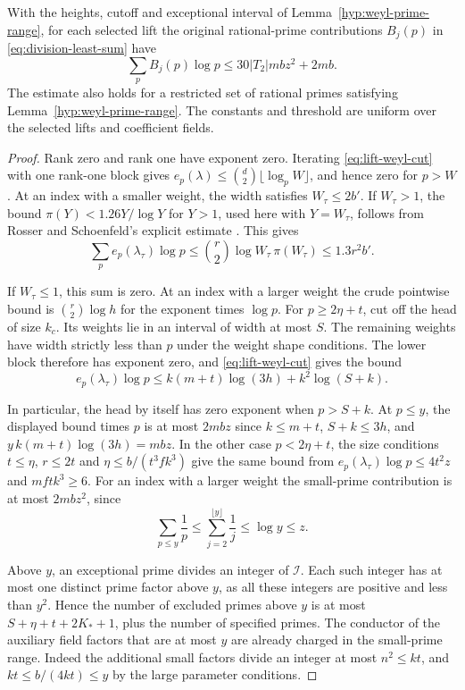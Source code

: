 \begin{proposition}
\label{prop:selected-weyl-prime-sum}
With the heights, cutoff and exceptional interval of
Lemma~\ref{hyp:weyl-prime-range}, for
each selected lift the original rational-prime contributions
\(B_j(p)\) in \eqref{eq:division-least-sum} have
\[
 \sum_p B_j(p)\log p\le30|T_2|mbz^2+2mb.
\]
The estimate also holds for a restricted set of rational primes
satisfying Lemma~\ref{hyp:weyl-prime-range}. The constants and threshold are
uniform over the selected lifts and coefficient fields.
\end{proposition}

\begin{proof}
Rank zero and rank one have exponent zero. Iterating
\eqref{eq:lift-weyl-cut} with one rank-one block gives
\(e_p(\lambda)\le\binom d2\lfloor\log_p W\rfloor\), and hence
zero for \(p>W\). At an index with a smaller weight, the width satisfies \(W_\tau\le2b'\).
If \(W_\tau>1\), the bound
\(\pi(Y)<1.26Y/\log Y\) for \(Y>1\), used here with
\(Y=W_\tau\), follows from Rosser and Schoenfeld's explicit
estimate \cite{rosser-schoenfeld-explicit}. This gives
\[
 \sum_p e_p(\lambda_\tau)\log p
 \le \binom r2\log W_\tau\,\pi(W_\tau)
 \le 1.3r^2 b'.
\]

If \(W_\tau\le1\), this sum is zero. At an index with a larger weight the
crude pointwise bound is \(\binom r2\log h\) for the
exponent times \(\log p\). For \(p\ge2\eta+t\), cut off the
head of size \(k_c\). Its weights lie in an interval of width
at most \(S\). The
remaining weights have width strictly less than \(p\) under
the weight shape conditions. The lower block therefore has
exponent zero, and \eqref{eq:lift-weyl-cut} gives the bound
\[
 e_p(\lambda_\tau)\log p\le
 k(m+t)\log(3h)+k^2\log(S+k).
\]

In particular, the head by itself has zero exponent when
\(p>S+k\). At \(p\le y\), the displayed bound times \(p\)
is at most \(2mbz\) since \(k\le m+t\), \(S+k\le3h\),
and \(y\,k(m+t)\log(3h)=mbz\). In the other case
\(p<2\eta+t\), the size conditions \(t\le\eta\), \(r\le2t\)
and \(\eta\le b/(t^3 f k^3)\) give the same bound from
\(e_p(\lambda_\tau)\log p\le4t^2 z\) and
\(m f t k^3\ge6\). For an index with a larger weight the small-prime contribution is at most \(2mbz^2\), since
\[
 \sum_{p\le y}\frac1p\le\sum_{j=2}^{\lfloor y\rfloor}\frac1j\le \log y\le z .
\]

Above \(y\), an exceptional prime divides an integer of
\(\mathcal I\). Each such integer has at most one distinct
prime factor above \(y\), as all these integers are positive
and less than \(y^2\). Hence the number of excluded primes
above \(y\) is at most \(S+\eta+t+2K_*+1\), plus the
number of specified primes. The conductor of the auxiliary field factors that
are at most \(y\) are already charged in the small-prime range.
Indeed the additional small factors divide an integer at most
\(n^2\le kt\), and \(kt\le b/(4kt)\le y\) by the large
parameter conditions.


\end{proof}
